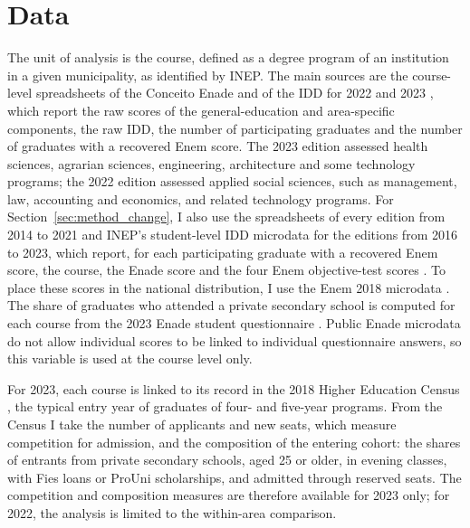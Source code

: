 \documentclass[11pt,a4paper]{article}
\begin{document}
\section{Data}\label{sec:data}

The unit of analysis is the course, defined as a degree program of an institution in a given municipality, as identified by INEP. The main sources are the course-level spreadsheets of the Conceito Enade and of the IDD for 2022 and 2023 \citep{inepidd2022,inepidd2023}, which report the raw scores of the general-education and area-specific components, the raw IDD, the number of participating graduates and the number of graduates with a recovered Enem score. The 2023 edition assessed health sciences, agrarian sciences, engineering, architecture and some technology programs; the 2022 edition assessed applied social sciences, such as management, law, accounting and economics, and related technology programs. For Section~\ref{sec:method_change}, I also use the spreadsheets of every edition from 2014 to 2021 \citep{inepidd2019,inepindicadores} and INEP's student-level IDD microdata for the editions from 2016 to 2023, which report, for each participating graduate with a recovered Enem score, the course, the Enade score and the four Enem objective-test scores \citep{inepiddmicro}. To place these scores in the national distribution, I use the Enem 2018 microdata \citep{inepenem2018}. The share of graduates who attended a private secondary school is computed for each course from the 2023 Enade student questionnaire \citep{inepenade}. Public Enade microdata do not allow individual scores to be linked to individual questionnaire answers, so this variable is used at the course level only.

For 2023, each course is linked to its record in the 2018 Higher Education Census \citep{inepcenso}, the typical entry year of graduates of four- and five-year programs. From the Census I take the number of applicants and new seats, which measure competition for admission, and the composition of the entering cohort: the shares of entrants from private secondary schools, aged 25 or older, in evening classes, with Fies loans or ProUni scholarships, and admitted through reserved seats. The competition and composition measures are therefore available for 2023 only; for 2022, the analysis is limited to the within-area comparison.
\end{document}
